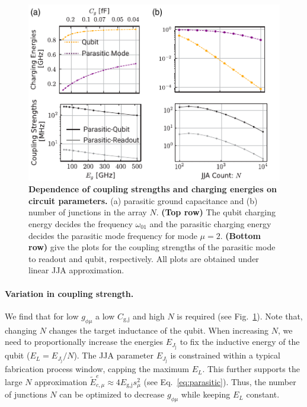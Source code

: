 \documentclass[%
reprint,
superscriptaddress,
 amsmath,amssymb,
 aps,
 prx,
longbibliography,
floatfix,
]{revtex4-2}
\begin{document}
 
 
\begin{figure}[t]
    \centering
    \includegraphics[width=\linewidth]{Supp_Fig/Circuit_comp.pdf}
    \caption{{\bf Dependence of coupling strengths and charging energies on circuit parameters.} (a) parasitic ground capacitance and (b) number of junctions in the array $N$. {\bf (Top row)} The qubit charging energy decides the frequency $\omega_{01}$ and the parasitic charging energy decides the parasitic mode frequency for mode $\mu=2$. {\bf (Bottom row)} give the plots for the coupling strengths of the parasitic mode to readout and qubit, respectively. All plots are obtained under linear JJA approximation.}
    \label{fig:circuit_comp}
\end{figure}

\paragraph{Variation in coupling strength.}\label{coupling}  We find that for low $g_{\phi\mu}$ a low $C_\textrm{g,j}$ and high $N$ is required (see Fig.~\ref{fig:circuit_comp}). Note that, changing $N$ changes the target inductance of the qubit. When increasing $N$, we need to proportionally increase the energies $E_{J_\textrm{j}}$ to fix the inductive energy of the qubit ($E_L=E_{J_\textrm{j}}/N$). The JJA parameter $E_{J_\textrm{j}}$ is constrained within a typical fabrication process window, capping the maximum $E_{L}$. This further supports the large $N$ approximation $\tilde{E}_{c,\mu}^e\approx 4E_{\textrm{g,j}}s_\mu^2$ (see Eq.~\ref{eq:parasitic}). Thus, the number of junctions $N$ can be optimized to decrease $g_{\phi\mu}$ while keeping $E_L$ constant. 
\end{document}
